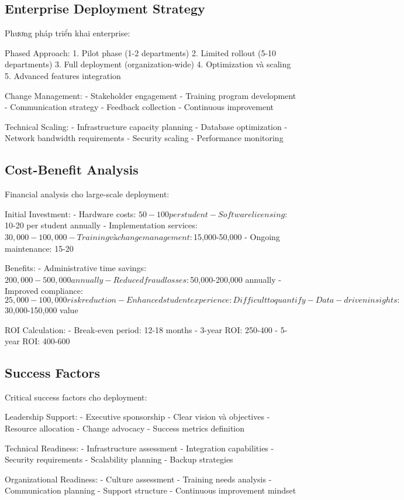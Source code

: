\documentclass[12pt,a4paper]{report}
\begin{document}
\subsection{Enterprise Deployment Strategy}
Phương pháp triển khai enterprise:

Phased Approach:
1. Pilot phase (1-2 departments)
2. Limited rollout (5-10 departments)
3. Full deployment (organization-wide)
4. Optimization và scaling
5. Advanced features integration

Change Management:
- Stakeholder engagement
- Training program development
- Communication strategy
- Feedback collection
- Continuous improvement

Technical Scaling:
- Infrastructure capacity planning
- Database optimization
- Network bandwidth requirements
- Security scaling
- Performance monitoring

\subsection{Cost-Benefit Analysis}
Financial analysis cho large-scale deployment:

Initial Investment:
- Hardware costs: $50-100 per student
- Software licensing: $10-20 per student annually
- Implementation services: $30,000-100,000
- Training và change management: $15,000-50,000
- Ongoing maintenance: 15-20%

Benefits:
- Administrative time savings: $200,000-500,000 annually
- Reduced fraud losses: $50,000-200,000 annually
- Improved compliance: $25,000-100,000 risk reduction
- Enhanced student experience: Difficult to quantify
- Data-driven insights: $30,000-150,000 value

ROI Calculation:
- Break-even period: 12-18 months
- 3-year ROI: 250-400%
- 5-year ROI: 400-600%

\subsection{Success Factors}
Critical success factors cho deployment:

Leadership Support:
- Executive sponsorship
- Clear vision và objectives
- Resource allocation
- Change advocacy
- Success metrics definition

Technical Readiness:
- Infrastructure assessment
- Integration capabilities
- Security requirements
- Scalability planning
- Backup strategies

Organizational Readiness:
- Culture assessment
- Training needs analysis
- Communication planning
- Support structure
- Continuous improvement mindset
\end{document}
